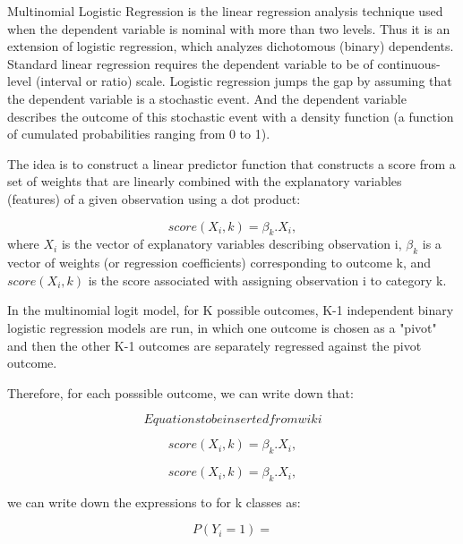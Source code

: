 \documentclass[journal]{IEEEtran}
\begin{document}
Multinomial Logistic Regression is the linear regression analysis technique used when the dependent variable is nominal with more than two levels. Thus it is an extension of logistic regression, which analyzes dichotomous (binary) dependents. Standard linear regression requires the dependent variable to be of continuous-level (interval or ratio) scale.  Logistic regression jumps the gap by assuming that the dependent variable is a stochastic event.  And the dependent variable describes the outcome of this stochastic event with a density function (a function of cumulated probabilities ranging from 0 to 1).\par
The idea is to construct a linear predictor function that constructs a score from a set of weights that are linearly combined with the explanatory variables (features) of a given observation using a dot product: \par
\begin{equation}
	score(X_i,k) = \beta_k . X_i,
\end{equation}
where $X_i$ is the vector of explanatory variables describing observation i, $\beta_k$ is a vector of weights (or regression coefficients) corresponding to outcome k, and $score(X_i, k)$ is the score associated with assigning observation i to category k. \par
In the multinomial logit model, for K possible outcomes, K-1 independent binary logistic regression models are run, in which one outcome is chosen as a "pivot" and then the other K-1 outcomes are separately regressed against the pivot outcome. \par
Therefore, for each posssible outcome, we can write down that: \par

\begin{equation}
	Equations to be inserted from wiki
\end{equation}

\begin{equation}
score(X_i,k) = \beta_k . X_i,
\end{equation}

\begin{equation}
score(X_i,k) = \beta_k . X_i,
\end{equation}


we can write down the expressions to for k classes as: \par
\begin{equation}
P(Y_i = 1) = 
\end{equation}
\end{document}
